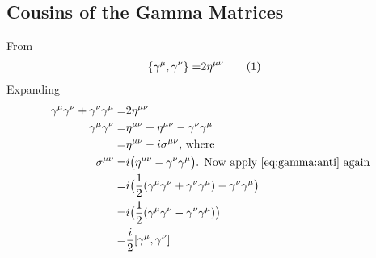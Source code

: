 \documentclass[]{article}
\newcommand\numberthis{\addtocounter{equation}{1}\tag{\theequation}}
\begin{document}
\subsection{Cousins of the Gamma Matrices}

From \cite[II,(2)]{zee2010quantum}
\begin{align*}
	\{\gamma^\mu,\gamma^\nu\}=&2\eta^{\mu\nu} \numberthis \label{eq:gamma:anti}
\end{align*}
Expanding
\begin{align*} 
	\gamma^\mu\gamma^\nu + \gamma^\nu\gamma^\mu=&2\eta^{\mu\nu}\\
	\gamma^\mu\gamma^\nu =& \eta^{\mu\nu} + \eta^{\mu\nu} -\gamma^\nu\gamma^\mu\\
	=&\eta^{\mu\nu}-i\sigma^{\mu\nu} \text{, where}\\
	\sigma^{\mu\nu}=&i \big(\eta^{\mu\nu} -\gamma^\nu\gamma^\mu\big) \text{. Now apply \eqref{eq:gamma:anti} again}\\
	=&i\big(\frac{1}{2}(\gamma^\mu\gamma^\nu + \gamma^\nu\gamma^\mu)-\gamma^\nu\gamma^\mu\big)\\
	=&i\big(\frac{1}{2}(\gamma^\mu\gamma^\nu - \gamma^\nu\gamma^\mu)\big)\\
	=&\frac{i}{2}[\gamma^\mu,\gamma^\nu]
\end{align*}
\end{document}

